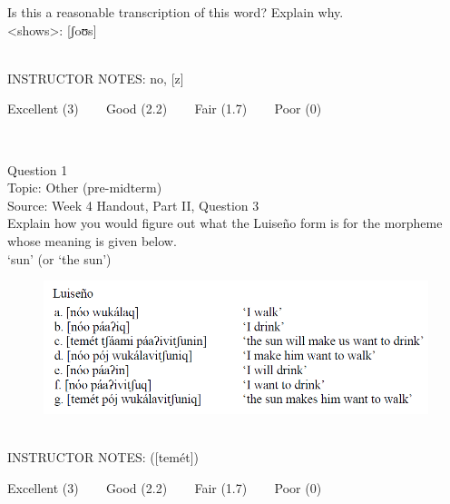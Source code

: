 \documentclass[12pt]{article}
\begin{document}
Is this a reasonable transcription of this word? Explain why.\\

<shows>: {[ʃoʊs]}


~\\
INSTRUCTOR NOTES: no, [z]


\vfill
Excellent (3) ~~~ Good (2.2) ~~~ Fair (1.7) ~~~ Poor (0)
\newpage

\begin{center}
\textbf{{\color{red}{\HUGE END OF EXAM}}}\\

\end{center}
\newpage

\begin{center}
\textbf{{\color{blue}{\HUGE START OF EXAM\\}}}

\textbf{{\color{blue}{\HUGE Student ID: 47906\\}}}

\textbf{{\color{blue}{\HUGE 9:10\\}}}

\end{center}
\newpage

{\large Question 1}\\

Topic: Other (pre-midterm)\\
Source: Week 4 Handout, Part II, Question 3\\

Explain how you would figure out what the Luiseño form is for the morpheme whose meaning is given below.\\

‘sun’ (or ‘the sun’)

\begin{figure}[H]
\includegraphics{../images/luiseno.png}
\end{figure}

~\\
INSTRUCTOR NOTES: ([temét])


\vfill
Excellent (3) ~~~ Good (2.2) ~~~ Fair (1.7) ~~~ Poor (0)
\newpage
\end{document}
